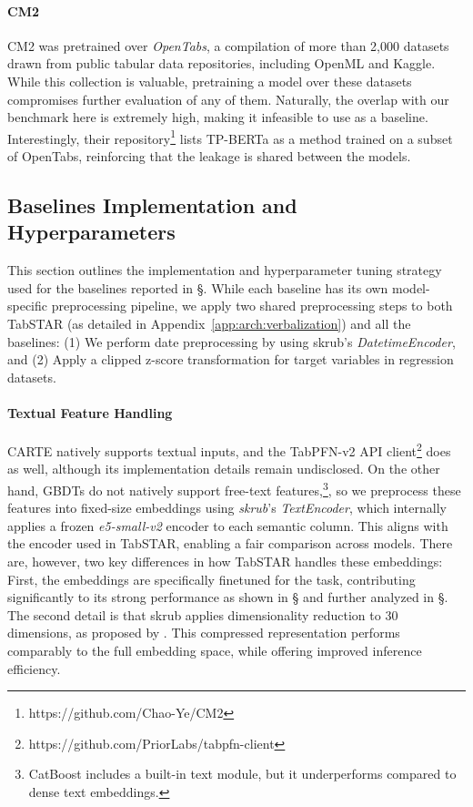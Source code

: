 \paragraph{CM2} CM2 was pretrained over \textit{OpenTabs}, a compilation of more than 2,000 datasets drawn from public tabular data repositories, including OpenML and Kaggle. While this collection is valuable, pretraining a model over these datasets compromises further evaluation of any of them. Naturally, the overlap with our benchmark here is extremely high, making it infeasible to use as a baseline. Interestingly, their repository\footnote{https://github.com/Chao-Ye/CM2} lists TP-BERTa as a method trained on a subset of OpenTabs, reinforcing that the leakage is shared between the models.

\subsection{Baselines Implementation and Hyperparameters} \label{app:baselines_used} 

This section outlines the implementation and hyperparameter tuning strategy used for the baselines reported in \S{}. While each baseline has its own model-specific preprocessing pipeline, we apply two shared preprocessing steps to both TabSTAR (as detailed in Appendix~\ref{app:arch:verbalization}) and all the baselines: (1) We perform date preprocessing by using skrub's \textit{DatetimeEncoder}, and (2) Apply a clipped z-score transformation for target variables in regression datasets.

\paragraph{Textual Feature Handling}\label{app:baselines_text_feat} CARTE natively supports textual inputs, and the TabPFN-v2 API client\footnote{https://github.com/PriorLabs/tabpfn-client} does as well, although its implementation details remain undisclosed. On the other hand, GBDTs do not natively support free-text features,\footnote{CatBoost includes a built-in text module, but it underperforms compared to dense text embeddings.}, so we preprocess these features into fixed-size embeddings using \textit{skrub}'s \textit{TextEncoder}, which internally applies a frozen \textit{e5-small-v2} encoder to each semantic column. This aligns with the encoder used in TabSTAR, enabling a fair comparison across models. There are, however, two key differences in how TabSTAR handles these embeddings: First, the embeddings are specifically finetuned for the task, contributing significantly to its strong performance as shown in \S{} and further analyzed in \S{}. The second detail is that skrub applies dimensionality reduction to 30 dimensions, as proposed by \cite{grinsztajn_vectorizing_2023}. This compressed representation performs comparably to the full embedding space, while offering improved inference efficiency.


